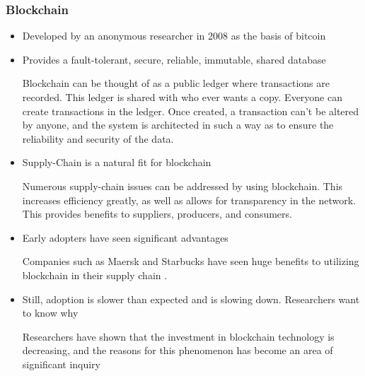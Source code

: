 \begin{frame}
  \frametitle{Blockchain}
  \begin{itemize}
    \item<1-> Developed by an anonymous researcher in 2008 as the basis of bitcoin

    \item<2-> Provides a fault-tolerant, secure, reliable, immutable, shared database

           {\scriptsize{Blockchain can be thought of as a public ledger where transactions are recorded. This ledger is shared with who ever wants a copy. Everyone can create transactions in the ledger. Once created, a transaction can't be altered by anyone, and the system is architected in such a way as to ensure the reliability and security of the data. }}

    \item<3-> Supply-Chain is a natural fit for blockchain

           {\scriptsize{Numerous supply-chain issues can be addressed by using blockchain. This increases efficiency greatly, as well as allows for transparency in the network. This provides benefits to suppliers, producers, and consumers.
          }}

    \item<4-> Early adopters have seen significant advantages

          {\scriptsize{Companies such as Maersk and Starbucks have seen huge benefits to utilizing blockchain in their supply chain \parencite{papathanasiouNonApplicationBlockchain2020,fossowambaDynamicsBlockchainAdoption2020}.}}

    \item<5-> Still, adoption is slower than expected and is slowing down. Researchers want to know why

           {\scriptsize{Researchers have shown that the investment in blockchain technology is decreasing, and the reasons for this phenomenon has become an area of significant inquiry}}
  \end{itemize}
\end{frame}
